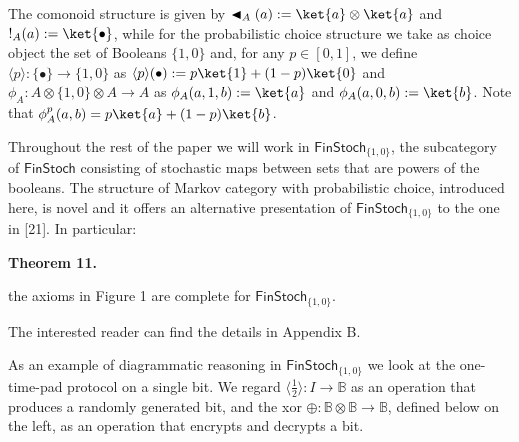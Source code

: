  
 
The comonoid structure is given by $\blacktriangleleft_{A}(a):=\ket{a}\otimes\ket{a}$ and $!_{A}(a):=\ket{\bullet}$, while for the probabilistic choice structure we take as choice object the set of Booleans $\{1,0\}$ and, for any $p\in[0,1]$, we define $\langle p\rangle\colon\{\bullet\}\to\{1,0\}$ as $\langle p\rangle(\bullet):=p\ket{1}+(1-p)\ket{0}$ and $\phi_{A}\colon A\otimes\{1,0\}\otimes A\to A$ as $\phi_{A}(a,1,b):=\ket{a}$ and $\phi_{A}(a,0,b):=\ket{b}$. Note that $\phi^{p}_{A}(a,b)=p\ket{a}+(1-p)\ket{b}$.\par
 
 
 
Throughout the rest of the paper we will work in $\mathsf{FinStoch}_{\{1,0\}}$, the subcategory of $\mathsf{FinStoch}$ consisting of stochastic maps between sets that are powers of the booleans. The structure of Markov category with probabilistic choice, introduced here, is novel and it offers an alternative presentation of $\mathsf{FinStoch}_{\{1,0\}}$ to the one in [21]. In particular:\par
 
 
 
\par\medskip\noindent\textbf{Theorem 11.}\par
 
 
the axioms in Figure 1 are complete for $\mathsf{FinStoch}_{\{1,0\}}$.\par
 
 
 
 
The interested reader can find the details in Appendix B.\par
 
 
 
As an example of diagrammatic reasoning in $\mathsf{FinStoch}_{\{1,0\}}$ we look at the one-time-pad protocol on a single bit. We regard $\langle\frac{1}{2}\rangle\colon I\to\mathbb{B}$ as an operation that produces a randomly generated bit, and the xor $\oplus\colon\mathbb{B}\otimes\mathbb{B}\to\mathbb{B}$, defined below on the left, as an operation that encrypts and decrypts a bit.\par
 
